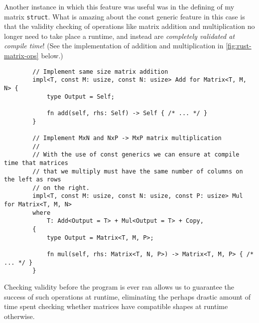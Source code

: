 \documentclass{report}
\newenvironment{code}{\captionsetup{type=listing}}{}
\begin{document}
Another instance in which this feature was useful was in the defining of my
matrix \texttt{struct}. What is amazing about the const generic feature in this
case is that the validity checking of operations like matrix addition and
multiplication no longer need to take place a runtime, and instead are
\emph{completely validated at compile time}! (See the implementation of addition
and multiplication in \cref{fig:rust-matrix-ops} below.)
\begin{code}
    \begin{verbatim}
        // Implement same size matrix addition
        impl<T, const M: usize, const N: usize> Add for Matrix<T, M, N> {
            type Output = Self;

            fn add(self, rhs: Self) -> Self { /* ... */ }
        }

        // Implement MxN and NxP -> MxP matrix multiplication
        //
        // With the use of const generics we can ensure at compile time that matrices
        // that we multiply must have the same number of columns on the left as rows
        // on the right.
        impl<T, const M: usize, const N: usize, const P: usize> Mul for Matrix<T, M, N>
        where
            T: Add<Output = T> + Mul<Output = T> + Copy,
        {
            type Output = Matrix<T, M, P>;

            fn mul(self, rhs: Matrix<T, N, P>) -> Matrix<T, M, P> { /* ... */ }
        }
    \end{verbatim}
    \caption{%
        Excerpt of my implementation of matrices in Rust,
        using traits and the const generic feature.
    }
    \label{fig:rust-matrix-ops}
\end{code}
\noindent
Checking validity before the program is ever ran allows us to guarantee the
success of such operations at runtime, eliminating the perhaps drastic amount of
time spent checking whether matrices have compatible shapes at runtime
otherwise.
\end{document}
